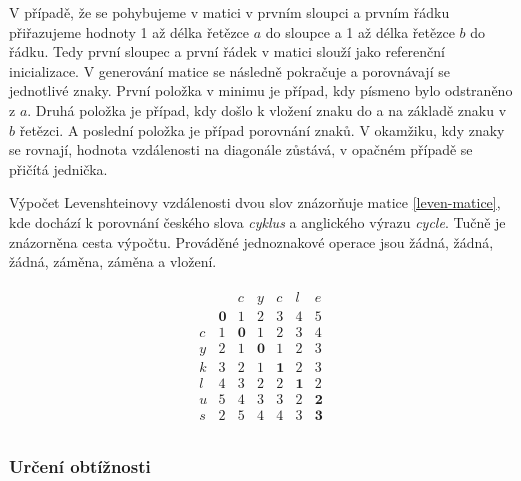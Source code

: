 \documentclass[a4paper,11pt,titlepage,fleqn]{article}
\begin{document}
            V případě, že se pohybujeme v matici v prvním sloupci a prvním řádku přiřazujeme hodnoty 1 až délka řetězce $a$ do sloupce a 1 až délka řetězce $b$ do řádku. Tedy první sloupec a první řádek v matici slouží jako referenční inicializace. V generování matice se následně pokračuje a porovnávají se jednotlivé znaky. První položka v minimu je případ, kdy písmeno bylo odstraněno z $a$. Druhá položka je případ, kdy došlo k vložení znaku do a na základě znaku v $b$ řetězci. A poslední položka je případ porovnání znaků. V okamžiku, kdy znaky se rovnají, hodnota vzdálenosti na diagonále zůstává, v opačném případě se přičítá jednička.

            Výpočet Levenshteinovy vzdálenosti dvou slov znázorňuje matice \ref{leven-matice}, kde dochází k porovnání českého slova \textit{cyklus} a anglického výrazu \textit{cycle}. Tučně je znázorněna cesta výpočtu. Prováděné jednoznakové operace jsou žádná, žádná, žádná, záměna, záměna a vložení.

            \begin{ceqn}
            \begin{align}
                \label{leven-matice}
                \begin{matrix}
                    &  & c & y & c & l & e \\
                    & \textbf{0} & 1 & 2  & 3 & 4  & 5 \\
                    c & 1 & \textbf{0} & 1 & 2 & 3 & 4 \\
                    y & 2 & 1 & \textbf{0} & 1 & 2 & 3 \\
                    k & 3 & 2 & 1 & \textbf{1} & 2 & 3 \\
                    l & 4 & 3 & 2 & 2 & \textbf{1} & 2 \\
                    u & 5 & 4 & 3 & 3 & 2 & \textbf{2} \\
                    s & 2 & 5 & 4 & 4 & 3 & \textbf{3} \\ 
                \end{matrix}
            \end{align}
            \end{ceqn}

        \subsubsection{Určení obtížnosti}
\end{document}
